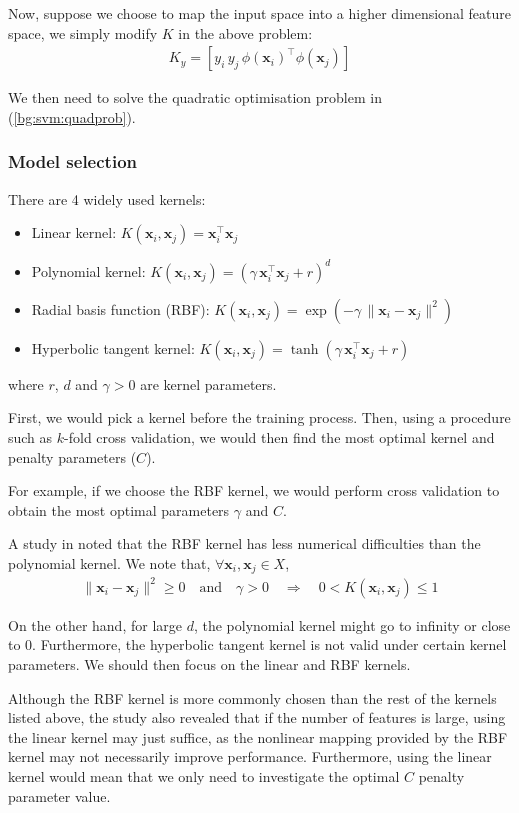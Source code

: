 \documentclass[12pt, twoside, a4paper]{article}
\def\vec{\boldsymbol}
\begin{document}
Now, suppose we choose to map the input space into a higher dimensional feature space, we simply modify $K$ in the above problem:
\begin{align*}
K_y = [y_i \, y_j \, \phi(\vec{x}_i)^\top \phi(\vec{x}_j)]
\end{align*}

We then need to solve the quadratic optimisation problem in (\ref{bg:svm:quadprob}).

\subsubsection{Model selection}
There are 4 widely used kernels:
\begin{itemize}
\item Linear kernel: $K(\vec{x}_i, \vec{x}_j) = \vec{x}_i^\top \vec{x}_j$
\item Polynomial kernel: $K(\vec{x}_i, \vec{x}_j) = (\gamma \, \vec{x}_i^\top \vec{x}_j + r)^d$
\item Radial basis function (RBF): $K(\vec{x}_i, \vec{x}_j) = \exp(-\gamma \, \| \vec{x}_i - \vec{x}_j \|^2)$
\item Hyperbolic tangent kernel: $K(\vec{x}_i, \vec{x}_j) = \tanh(\gamma \, \vec{x}_i^\top \vec{x}_j + r)$
\end{itemize}
where $r$, $d$ and $\gamma>0$ are kernel parameters.

First, we would pick a kernel before the training process. Then, using a procedure such as $k$-fold cross validation, we would then find the most optimal kernel and penalty parameters ($C$).

For example, if we choose the RBF kernel, we would  perform cross validation to obtain the most optimal parameters $\gamma$ and $C$.

A study in \cite{RefWorks:128} noted that the RBF kernel has less numerical difficulties than the polynomial kernel. We note that, $\forall \vec{x}_i, \vec{x}_j \in X$,
\begin{align*}
\| \vec{x}_i - \vec{x}_j \|^2 \geq 0 \quad \text{and} \quad \gamma > 0 \quad \Rightarrow \quad 0 < K(\vec{x}_i, \vec{x}_j) \leq 1 
\end{align*}

On the other hand, for large $d$, the polynomial kernel might go to infinity or close to 0. Furthermore, the hyperbolic tangent kernel is not valid under certain kernel parameters. We should then focus on the linear and RBF kernels.

Although the RBF kernel is more commonly chosen than the rest of the kernels listed above, the study also revealed that if the number of features is large, using the linear kernel may just suffice, as the nonlinear mapping provided by the RBF kernel may not necessarily improve performance. Furthermore, using the linear kernel would mean that we only need to investigate the optimal $C$ penalty parameter value.
\end{document}

